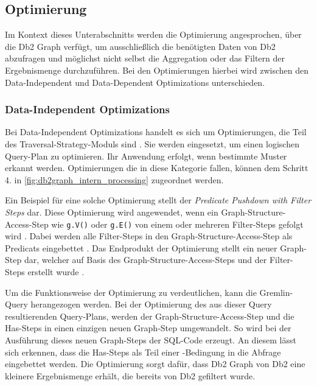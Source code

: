\subsection{Optimierung}
\label{db2graph:optimierung}

Im Kontext dieses Unterabschnitts werden die Optimierung angesprochen, über die Db2 Graph verfügt, um ausschließlich die benötigten Daten von Db2 abzufragen und möglichst nicht selbst die Aggregation oder das Filtern der Ergebnismenge durchzuführen. Bei den Optimierungen hierbei wird zwischen den Data-Independent und Data-Dependent Optimizations unterschieden. 

\subsubsection{Data-Independent Optimizations}
Bei Data-Independent Optimizations handelt es sich um Optimierungen, die Teil des Traversal-Strategy-Moduls sind \cite{sigmod_tian}. Sie werden eingesetzt, um einen logischen Query-Plan zu optimieren. Ihr Anwendung erfolgt, wenn bestimmte Muster erkannt werden. Optimierungen die in diese Kategorie fallen, können dem Schritt 4. in \autoref{fig:db2graph_intern_processing} zugeordnet werden. 

Ein Beispiel für eine solche Optimierung stellt der \textit{Predicate Pushdown with Filter Steps} dar. Diese Optimierung wird angewendet, wenn ein Graph-Structure-Access-Step wie \texttt{g.V()} oder \texttt{g.E()} von einem oder mehreren Filter-Steps gefolgt wird \cite{sigmod_tian}. Dabei werden alle Filter-Steps in den Graph-Structure-Access-Step als Predicats eingebettet \cite{sigmod_tian}. Das Endprodukt der Optimierung stellt ein neuer Graph-Step dar, welcher auf Basis des Graph-Structure-Access-Steps und der Filter-Steps erstellt wurde \cite{sigmod_tian}. 
    
Um die Funktionsweise der Optimierung zu verdeutlichen, kann die Gremlin-Query  herangezogen werden. Bei der Optimierung des aus dieser Query resultierenden Query-Plans, werden der Graph-Structure-Access-Step und die Has-Steps in einen einzigen neuen Graph-Step umgewandelt. So wird bei der Ausführung dieses neuen Graph-Steps der SQL-Code  erzeugt. An diesem lässt sich erkennen, dass die Has-Steps als Teil einer -Bedingung in die Abfrage eingebettet werden. Die Optimierung sorgt dafür, dass Db2 Graph von Db2 eine kleinere Ergebnismenge erhält, die bereits von Db2 gefiltert wurde.

